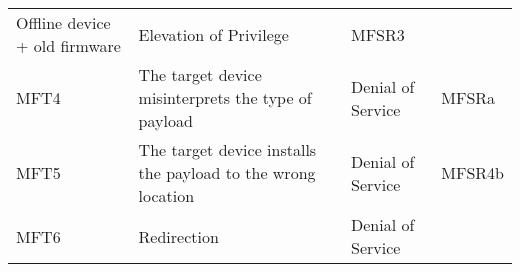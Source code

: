 \documentclass[0-thesis.tex]{subfiles}
\begin{document}
\begin{longtable}[]{@{}llll@{}}
\begin{minipage}[t]{0.44\columnwidth}
    Offline device + old firmware\strut
    \end{minipage} & \begin{minipage}[t]{0.30\columnwidth}\raggedright\strut
    Elevation of Privilege\strut
    \end{minipage} & \begin{minipage}[t]{0.09\columnwidth}\raggedright\strut
    MFSR3\strut
    \end{minipage}\tabularnewline
    \begin{minipage}[t]{0.05\columnwidth}\raggedright\strut
    MFT4\strut
    \end{minipage} & \begin{minipage}[t]{0.44\columnwidth}\raggedright\strut
    The target device misinterprets the type of payload\strut
    \end{minipage} & \begin{minipage}[t]{0.30\columnwidth}\raggedright\strut
    Denial of Service\strut
    \end{minipage} & \begin{minipage}[t]{0.09\columnwidth}\raggedright\strut
    MFSRa\strut
    \end{minipage}\tabularnewline
    \begin{minipage}[t]{0.05\columnwidth}\raggedright\strut
    MFT5\strut
    \end{minipage} & \begin{minipage}[t]{0.44\columnwidth}\raggedright\strut
    The target device installs the payload to the wrong location\strut
    \end{minipage} & \begin{minipage}[t]{0.30\columnwidth}\raggedright\strut
    Denial of Service\strut
    \end{minipage} & \begin{minipage}[t]{0.09\columnwidth}\raggedright\strut
    MFSR4b\strut
    \end{minipage}\tabularnewline
    \begin{minipage}[t]{0.05\columnwidth}\raggedright\strut
    MFT6\strut
    \end{minipage} & \begin{minipage}[t]{0.44\columnwidth}\raggedright\strut
    Redirection\strut
    \end{minipage} & \begin{minipage}[t]{0.30\columnwidth}\raggedright\strut
    Denial of Service\strut
    \end{minipage} & \begin{minipage}[t]{0.09\columnwidth}\raggedright\strut

\end{minipage}
\end{longtable}
\end{document}
